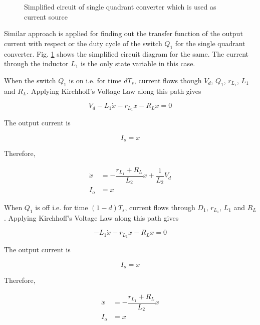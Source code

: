 \documentclass[a4paper]{IEEEtran}
\begin{document}
	\begin{figure}
		\centering
		
		\caption{Simplified circuit of single quadrant converter which is used as current source}
		\label{fig:working-5}
	\end{figure}

	Similar approach is applied for finding out the transfer function of the output current with respect or the duty cycle of the switch $Q_1$ for the single quadrant converter. Fig. \ref{fig:working-5} shows the simplified circuit diagram for the same. The current through the inductor $L_1$ is the only state variable in this case.

	When the switch $Q_1$ is on i.e. for time $dT_s$, current flows though $V_d$, $Q_1$, $r_{L_1}$, $L_1$ and $R_L$. Applying Kirchhoff's Voltage Law along this path gives
	
	\begin{equation}
		V_d - L_1 \dot{x} - r_{L_1}x - R_Lx = 0
		\label{eq:mod28}
	\end{equation}
	
	The output current is
	
	\begin{equation}
		I_o = x
		\label{eq:mod29}
	\end{equation}

	Therefore,
	
	\begin{equation}
		\begin{split}
			\dot{x} &= -\dfrac{r_{L_1}+R_L}{L_2}x +\dfrac{1}{L_2}V_d\\
			I_o &= x	
		\end{split}
		\label{eq:mod30}
	\end{equation}

	When $Q_1$ is off i.e. for time $(1-d)T_s$, current flows through  $D_1$, $r_{L_1}$, $L_1$ and $R_L$. Applying Kirchhoff's Voltage Law along this path gives
	
	\begin{equation}
		- L_1 \dot{x} - r_{L_1}x - R_Lx = 0
		\label{eq:mod31}
	\end{equation}
	
	The output current is
	
	\begin{equation}
		I_o = x
		\label{eq:mod32}
	\end{equation}
	
	Therefore,
	
	\begin{equation}
			\begin{split}
			\dot{x} &= -\dfrac{r_{L_1}+R_L}{L_2}x\\
			I_o &= x
		\end{split}
		\label{eq:mod33}
	\end{equation}
	
\end{document}
